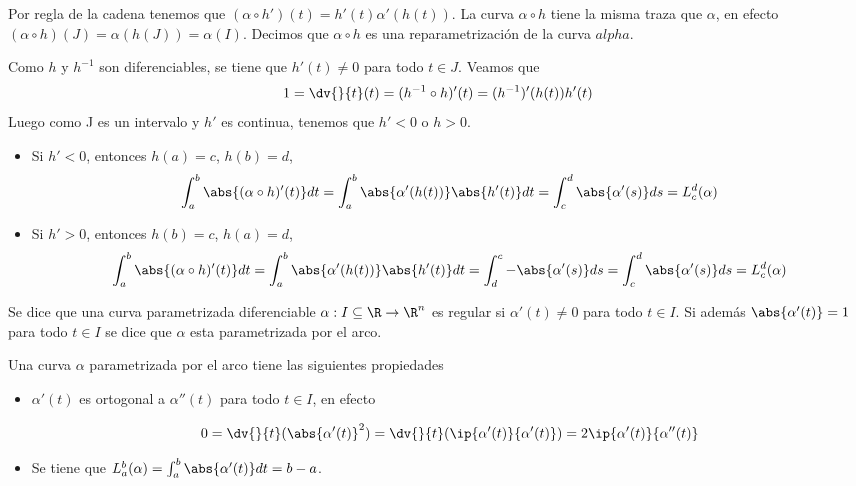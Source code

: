 \documentclass{article}
\begin{document}
\noindent Por regla de la cadena tenemos que $(\alpha\circ h')(t)=h'(t)\alpha'(h(t))$. La curva 
$\alpha\circ h$ tiene la misma traza que $\alpha$, en efecto $(\alpha\circ h)(J)=\alpha(h(J))=
\alpha(I)$. Decimos que $\alpha\circ h$ es una reparametrización de la curva $alpha$.

\begin{dem}
    Como $h$ y $h^{-1}$ son diferenciables, se tiene que $h'(t)\neq0$ para todo $t\in J$. Veamos
    que
    \begin{equation*}
        1=\dv{}{t}(t)=(h^{-1}\circ h)'(t)=(h^{-1})'(h(t))h'(t)
    \end{equation*}
    Luego como J es un intervalo y $h'$ es continua, tenemos que $h'<0$ o $h>0$.
    \begin{itemize}
        
        \item Si $h'<0$, entonces $h(a)=c$, $h(b)=d$,
        \begin{equation*}
            \int_{a}^{b}\abs{(\alpha\circ h)'(t)}dt=\int_{a}^{b}\abs{\alpha'(h(t))}\abs{h'(t)}dt=
            \int_{c}^{d}\abs{\alpha'(s)}ds=L_{c}^{d}(\alpha)
        \end{equation*}

        \item Si $h'>0$, entonces $h(b)=c$, $h(a)=d$,
        \begin{equation*}
            \int_{a}^{b}\abs{(\alpha\circ h)'(t)}dt=\int_{a}^{b}\abs{\alpha'(h(t))}\abs{h'(t)}dt=
            \int_{d}^{c}-\abs{\alpha'(s)}ds=\int_{c}^{d}\abs{\alpha'(s)}ds=L_{c}^{d}(\alpha)
        \end{equation*}

    \end{itemize}
\end{dem}

\begin{dfn}
    Se dice que una curva parametrizada diferenciable $\alpha: I\subseteq\R\to\R^{n}$ es regular si
    $\alpha'(t)\neq0$ para todo $t\in I$. Si además $\abs{\alpha'(t)}=1$ para todo $t\in I$ se dice
    que $\alpha$ esta parametrizada por el arco.
\end{dfn}

\noindent Una curva $\alpha$ parametrizada por el arco tiene las siguientes propiedades

\begin{itemize}
    \item $\alpha'(t)$ es ortogonal a $\alpha''(t)$ para todo $t\in I$, en efecto
    
    \begin{equation*}
        0=\dv{}{t}(\abs{\alpha'(t)}^{2})=\dv{}{t}(\ip{\alpha'(t)}{\alpha'(t)})=2\ip{\alpha'(t)}
        {\alpha''(t)}
    \end{equation*}

    \item Se tiene que $L_{a}^{b}(\alpha)=\int_{a}^{b}\abs{\alpha'(t)}dt=b-a$.
\end{itemize}
\end{document}
